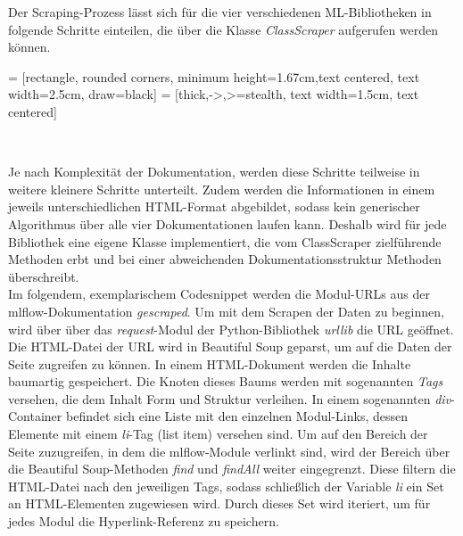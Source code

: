 \documentclass[german,bachelor]{swsLeipzig}
\begin{document}
Der Scraping-Prozess lässt sich für die vier verschiedenen ML-Bibliotheken in folgende Schritte einteilen, die über die Klasse
\textit{ClassScraper} aufgerufen werden können.

 = [rectangle, rounded corners, minimum height=1.67cm,text centered, text width=2.5cm, draw=black]
 = [thick,->,>=stealth, text width=1.5cm, text centered]

\begin{center}
\end{center}
\


Je nach Komplexität der Dokumentation, werden diese Schritte teilweise in weitere kleinere Schritte unterteilt.
Zudem werden die Informationen in einem jeweils unterschiedlichen HTML-Format abgebildet,
sodass kein generischer Algorithmus über alle vier Dokumentationen laufen kann.
Deshalb wird für jede Bibliothek eine eigene Klasse implementiert, die vom ClassScraper zielführende Methoden erbt und
bei einer abweichenden Dokumentationsstruktur Methoden überschreibt. \\

Im folgendem, exemplarischem Codesnippet werden die Modul-URLs aus der mlflow-Dokumentation \textit{gescraped}.
Um mit dem Scrapen der Daten zu beginnen, wird über über das \textit{request}-Modul der Python-Bibliothek \textit{urllib} die URL geöffnet.
Die HTML-Datei der URL wird in Beautiful Soup geparst, um auf die Daten der Seite zugreifen zu können.
In einem HTML-Dokument werden die Inhalte baumartig gespeichert.
Die Knoten dieses Baums werden mit sogenannten \textit{Tags} versehen, die dem Inhalt Form und Struktur verleihen.
In einem sogenannten \textit{div}-Container befindet sich eine Liste mit den einzelnen Modul-Links, dessen Elemente mit
einem \textit{li}-Tag (list item) versehen sind.
Um auf den Bereich der Seite zuzugreifen, in dem die mlflow-Module verlinkt sind, wird der Bereich über die Beautiful Soup-Methoden
\textit{find} und \textit{findAll} weiter eingegrenzt.
Diese filtern die HTML-Datei nach den jeweiligen Tags, sodass schließlich der Variable \textit{li} ein Set an HTML-Elementen
zugewiesen wird.
Durch dieses Set wird iteriert, um für jedes Modul die Hyperlink-Referenz zu speichern.\\
\end{document}
